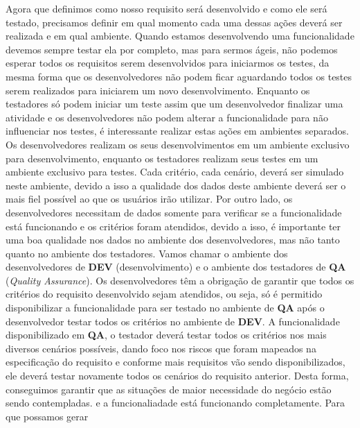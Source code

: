       Agora que definimos como nosso requisito será desenvolvido e como ele será
      testado, precisamos definir em qual momento cada uma dessas ações deverá ser
      realizada e em qual ambiente. Quando estamos desenvolvendo uma funcionalidade
      devemos sempre testar ela por completo, mas para sermos ágeis, não podemos
      esperar todos os requisitos serem desenvolvidos para iniciarmos os testes,
      da mesma forma que os desenvolvedores não podem ficar aguardando todos os
      testes serem realizados para iniciarem um novo desenvolvimento. Enquanto os
      testadores só podem iniciar um teste assim que um desenvolvedor finalizar
      uma atividade e os desenvolvedores não podem alterar a funcionalidade para não
      influenciar nos testes, é interessante realizar estas ações em ambientes
      separados. Os desenvolvedores realizam os seus desenvolvimentos em um ambiente
      exclusivo para desenvolvimento, enquanto os testadores realizam seus testes
      em um ambiente exclusivo para testes. Cada critério, cada cenário, deverá ser
      simulado neste ambiente, devido a isso a qualidade dos dados deste ambiente
      deverá ser o mais fiel possível ao que os usuários irão utilizar. Por outro
      lado, os desenvolvedores necessitam de dados somente para verificar se a
      funcionalidade está funcionando e os critérios foram atendidos, devido a isso,
      é importante ter uma boa qualidade nos dados no ambiente dos desenvolvedores,
      mas não tanto quanto no ambiente dos testadores. Vamos chamar o ambiente dos
      desenvolvedores de \textbf{DEV} (desenvolvimento) e o ambiente dos testadores
      de \textbf{QA} (\textit{Quality Assurance}). \newline
      Os desenvolvedores têm a obrigação de garantir que todos os critérios do
      requisito desenvolvido sejam atendidos, ou seja, só é permitido disponibilizar
      a funcionalidade para ser testado no ambiente de \textbf{QA} após o desenvolvedor
      testar todos os critérios no ambiente de \textbf{DEV}. A funcionalidade disponibilizado
      em \textbf{QA}, o testador deverá testar todos os critérios nos mais diversos
      cenários possíveis, dando foco nos riscos que foram mapeados na especificação
      do requisito e conforme mais requisitos vão sendo disponibilizados, ele deverá
      testar novamente todos os cenários do requisito anterior. Desta forma, conseguimos
      garantir que as situações de maior necessidade do negócio estão sendo contempladas.
      e a funcionaliadade está funcionando completamente. Para que possamos gerar

